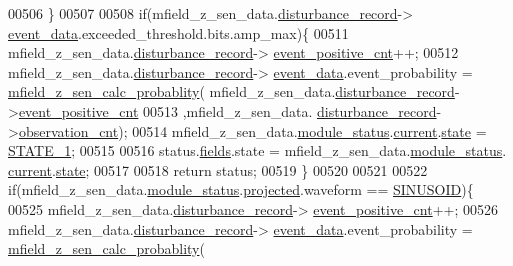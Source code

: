 \begin{DoxyCode}
00506             \}
00507 
00508             \textcolor{keywordflow}{if}(mfield\_z\_sen\_data.\hyperlink{a00027_ac9b38e2c1d3f1013a88d33506c754152}{disturbance\_record}->
      \hyperlink{a00028_a8c0bda69e71ef674e60da47ad0be9ab0}{event\_data}.exceeded\_threshold.bits.amp\_max)\{
00511                mfield\_z\_sen\_data.\hyperlink{a00027_ac9b38e2c1d3f1013a88d33506c754152}{disturbance\_record}->
      \hyperlink{a00028_a7397b9d76d4b57500f27bb23d258a18a}{event\_positive\_cnt}++;
00512                mfield\_z\_sen\_data.\hyperlink{a00027_ac9b38e2c1d3f1013a88d33506c754152}{disturbance\_record}->
      \hyperlink{a00028_a8c0bda69e71ef674e60da47ad0be9ab0}{event\_data}.event\_probability = \hyperlink{a00053_a8a5c3986dbe778d199b6e3b485f7a34b}{mfield\_z\_sen\_calc\_probablity}(
      mfield\_z\_sen\_data.\hyperlink{a00027_ac9b38e2c1d3f1013a88d33506c754152}{disturbance\_record}->\hyperlink{a00028_a7397b9d76d4b57500f27bb23d258a18a}{event\_positive\_cnt}
00513                                                                                     ,mfield\_z\_sen\_data.
      \hyperlink{a00027_ac9b38e2c1d3f1013a88d33506c754152}{disturbance\_record}->\hyperlink{a00028_ad5b0bac02ce266b91b2b52a1c3ea1d78}{observation\_cnt});
00514                mfield\_z\_sen\_data.\hyperlink{a00027_adfab5a5d8b45a93dfb13edb24e2b80e3}{module\_status}.\hyperlink{a00019_acf41ffc11da291c2f9f0fcb02ee72b98}{current}.\hyperlink{a00019_a6b8d8e916bc56265a3fd279bd26b6d1b}{state} = 
      \hyperlink{a00021_a727351838367f27ac0adb9a13422c342}{STATE\_1};
00515 
00516                status.\hyperlink{a00021_a5296d090c085b0421fdf5a86e382abea}{fields}.state = mfield\_z\_sen\_data.\hyperlink{a00027_adfab5a5d8b45a93dfb13edb24e2b80e3}{module\_status}.
      \hyperlink{a00019_acf41ffc11da291c2f9f0fcb02ee72b98}{current}.\hyperlink{a00019_a6b8d8e916bc56265a3fd279bd26b6d1b}{state};
00517 
00518                \textcolor{keywordflow}{return} status;
00519             \}
00520 
00521 
00522              \textcolor{keywordflow}{if}(mfield\_z\_sen\_data.\hyperlink{a00027_adfab5a5d8b45a93dfb13edb24e2b80e3}{module\_status}.\hyperlink{a00019_af2267fb093fb5dcaa006a570a6da3b6b}{projected}.waveform == 
      \hyperlink{a00019_a8956b2c85796334b2f0617ebd3cf9a52}{SINUSOID})\{
00525                mfield\_z\_sen\_data.\hyperlink{a00027_ac9b38e2c1d3f1013a88d33506c754152}{disturbance\_record}->
      \hyperlink{a00028_a7397b9d76d4b57500f27bb23d258a18a}{event\_positive\_cnt}++;
00526                mfield\_z\_sen\_data.\hyperlink{a00027_ac9b38e2c1d3f1013a88d33506c754152}{disturbance\_record}->
      \hyperlink{a00028_a8c0bda69e71ef674e60da47ad0be9ab0}{event\_data}.event\_probability = \hyperlink{a00053_a8a5c3986dbe778d199b6e3b485f7a34b}{mfield\_z\_sen\_calc\_probablity}(

\end{DoxyCode}
